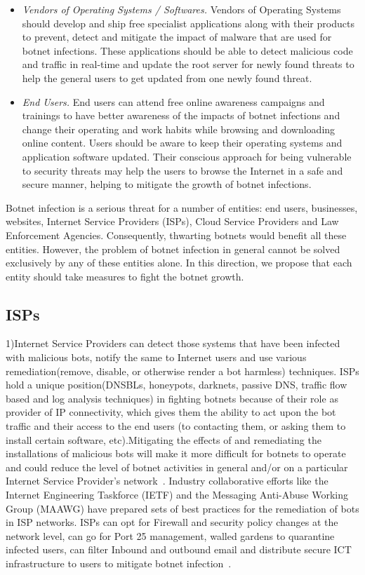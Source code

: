\label{cap:sec1}
\begin{itemize}
\item \textit{Vendors of Operating Systems / Softwares.} Vendors of Operating Systems should develop and ship free specialist applications along with their products to prevent, detect and mitigate the impact of malware that are used for botnet infections. These applications should be able to detect malicious code and traffic in real-time and update the root server for newly found threats to help the general users to get updated from one newly found threat.
\item \textit{End Users.} End users can attend free online awareness campaigns and trainings to have better awareness of the impacts of botnet infections and change their operating and work habits while browsing and downloading online content. Users should be aware to keep their operating systems and application software updated. Their conscious approach for being vulnerable to security threats may help the users to browse the Internet in a safe and secure manner, helping to mitigate the growth of botnet infections. 
\end{itemize}


Botnet infection is a serious threat for a number of entities: end users, businesses, websites, Internet Service Providers (ISPs), Cloud Service Providers and Law Enforcement Agencies. Consequently, thwarting botnets would benefit all these entities. However, the problem of botnet infection in general cannot be solved exclusively by any of these entities alone. In this direction, we propose that each entity should take measures to fight the botnet growth.

\subsection{ISPs}

1)Internet Service Providers can detect those systems that have been infected with malicious bots, notify the same to Internet users and use various remediation(remove, disable, or otherwise render a bot harmless) techniques. ISPs hold a unique position(DNSBLs, honeypots, darknets, passive DNS, traffic flow based and log analysis techniques) in fighting botnets because of  their role as provider of IP connectivity, which gives them the ability to act upon the bot traffic and their access to the end users (to contacting them, or asking them to install certain software, etc).Mitigating the effects of and remediating the installations of malicious bots will make it more difficult for botnets to operate and could reduce the level of botnet activities in general and/or on a particular Internet Service Provider's network~\cite{anderson2013measuring}. Industry collaborative efforts like the Internet Engineering Taskforce (IETF) and the Messaging Anti-Abuse Working Group (MAAWG) have prepared sets of best practices for the remediation of bots in ISP networks. ISPs can opt for Firewall and security policy changes at the network level, can go for Port 25 management, walled gardens to quarantine infected users, can filter Inbound and outbound email and distribute secure ICT infrastructure to users to mitigate botnet infection~\cite{charney2012collective}. 
	

